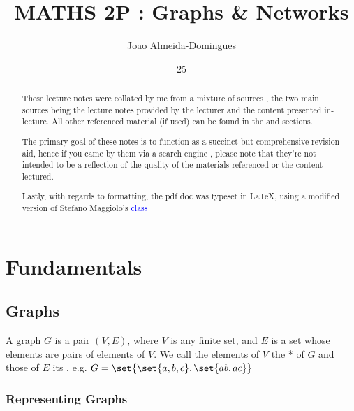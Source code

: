 \documentclass[english,course]{Notes}
\title{MATHS 2P : Graphs \& Networks}
\author{Joao Almeida-Domingues}
\date{25}{09}{2019}
\begin{document}
\newpage
\vspace*{\fill}
\begin{abstract}
\par{These lecture notes were collated by me from a mixture of sources , the two main sources being the lecture notes provided by the lecturer and the content presented in-lecture. All other referenced material (if used) can be found in the  and  sections.}
\par{The primary goal of these notes is to function as a succinct but comprehensive revision aid, hence if you came by them via a search engine , please note that they're not intended to be a reflection of the quality of the materials referenced or the content lectured.}
\par{Lastly, with regards to formatting, the pdf doc was typeset in \LaTeX , using a modified version of Stefano Maggiolo's \href{http://blog.poormansmath.net/latex-class-for-lecture-notes/}{\underline{\textcolor{blue}{class}}}}
\end{abstract}
\vspace*{\fill}
\newpage

\section
{Fundamentals}
\subsection{Graphs}

\par{A graph $G$ is a pair $(V,E)$, where $V$ is any finite set, and $E$ is a set whose elements are pairs of elements of $V$. We call the elements of $V$ the * of $G$ and those of $E$ its . e.g. $G=\set{\set{a,b,c} , \set{ab,ac}}$}




\subsubsection{Representing Graphs}
\end{document}
